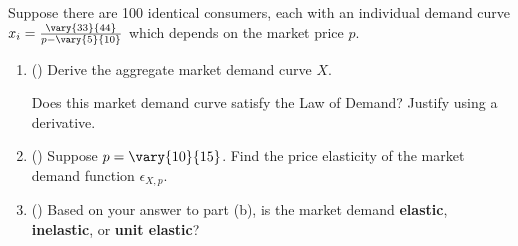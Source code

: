 \begin{question}[type=exam]{15}
  Suppose there are 100 identical consumers,
  each with an individual demand curve 
  $x_i = \frac{\vary{33}{44}}{p - \vary{5}{10}}$
  which depends on the market price $p$.

  \begin{enumerate}[label=\alph*)]

    \item ()
      Derive the aggregate market demand curve $X$.

      Does this market demand curve satisfy the Law of Demand?
      Justify using a derivative.
    \vspace{6cm}

  \item ()
    Suppose $p=\vary{10}{15}$.
    Find the price elasticity of the market demand function $\epsilon_{X,p}$.
    \vspace{8cm}

  \item ()
    Based on your answer to part (b), is the market demand \textbf{elastic}, \textbf{inelastic}, or \textbf{unit elastic}?
  
  \end{enumerate}
\end{question}
